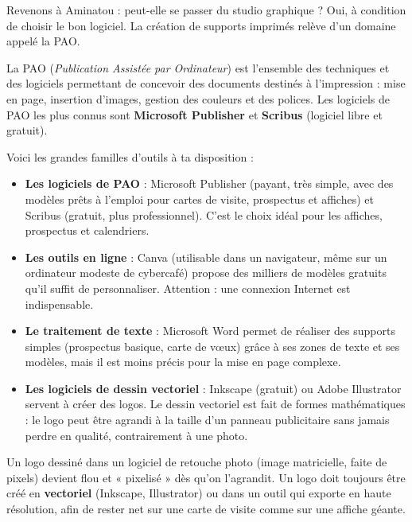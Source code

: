 \documentclass[11pt]{article}
\newcommand{\cle}[1]{{\popxbold\color{popdark}#1}}
\newcounter{popsec}
\newcounter{popsub}
\newcommand{\courssub}[1]{%
  \stepcounter{popsub}%
  \par\vspace{9pt}\noindent{\popxbold\fontsize{11.5}{13}\selectfont\color{popink}{\color{poporange}\thepopsec.\thepopsub}\hspace{6pt}#1}\par\nopagebreak\vspace{4pt}
}
\begin{document}
\courssub{Les outils logiciels de création}

Revenons à Aminatou : peut-elle se passer du studio graphique ? Oui, à condition de choisir le bon logiciel. La création de supports imprimés relève d'un domaine appelé la PAO.

\begin{definition}[PAO]
La \cle{PAO} (\emph{Publication Assistée par Ordinateur}) est l'ensemble des techniques et des logiciels permettant de concevoir des documents destinés à l'impression : mise en page, insertion d'images, gestion des couleurs et des polices. Les logiciels de PAO les plus connus sont \textbf{Microsoft Publisher} et \textbf{Scribus} (logiciel libre et gratuit).
\end{definition}

Voici les grandes familles d'outils à ta disposition :

\begin{itemize}
  \item \textbf{Les logiciels de PAO} : Microsoft Publisher (payant, très simple, avec des modèles prêts à l'emploi pour cartes de visite, prospectus et affiches) et Scribus (gratuit, plus professionnel). C'est le choix idéal pour les affiches, prospectus et calendriers.
  \item \textbf{Les outils en ligne} : Canva (utilisable dans un navigateur, même sur un ordinateur modeste de cybercafé) propose des milliers de modèles gratuits qu'il suffit de personnaliser. Attention : une connexion Internet est indispensable.
  \item \textbf{Le traitement de texte} : Microsoft Word permet de réaliser des supports simples (prospectus basique, carte de vœux) grâce à ses zones de texte et ses modèles, mais il est moins précis pour la mise en page complexe.
  \item \textbf{Les logiciels de dessin vectoriel} : Inkscape (gratuit) ou Adobe Illustrator servent à créer des \cle{logos}. Le dessin vectoriel est fait de formes mathématiques : le logo peut être agrandi à la taille d'un panneau publicitaire sans jamais perdre en qualité, contrairement à une photo.
\end{itemize}

\begin{attention}
Un logo dessiné dans un logiciel de retouche photo (image matricielle, faite de pixels) devient flou et « pixelisé » dès qu'on l'agrandit. Un logo doit toujours être créé en \textbf{vectoriel} (Inkscape, Illustrator) ou dans un outil qui exporte en haute résolution, afin de rester net sur une carte de visite comme sur une affiche géante.
\end{attention}
\end{document}
